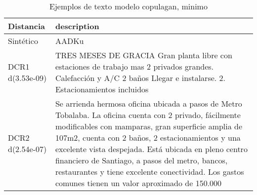 \begin{table}[H]
\centering
\fontsize{10}{14}\selectfont
\caption{Ejemplos de texto modelo copulagan, minimo}
\label{table-example-economicos-a-3-copulagan-min-text}
\begin{tabular}{|l|m{35em}|}
\hline
\rowcolor[gray]{0.8}
Distancia & description \\
\hline Sintético & AADKu \\
\hline DCR1 d(3.53e-09) & TRES MESES DE GRACIA  Gran planta libre con estaciones de trabajo mas 2 privados grandes. Calefacci\'on y A/C 2 ba\~nos Llegar e instalarse. 2. Estacionamientos incluidos \\
\hline DCR2 d(2.54e-07) & Se arrienda hermosa oficina ubicada a pasos de Metro Tobalaba.  La oficina cuenta con 2 privado, f\'acilmente modificables con mamparas, gran superficie amplia de 107m2, cuenta con 2 ba\~nos, 2 estacionamientos y una excelente vista despejada. Est\'a ubicada en pleno centro financiero de Santiago, a pasos del metro, bancos, restaurantes y tiene excelente conectividad. Los gastos comunes tienen un valor aproximado de 150.000 \\
\hline
\end{tabular}
\end{table}
